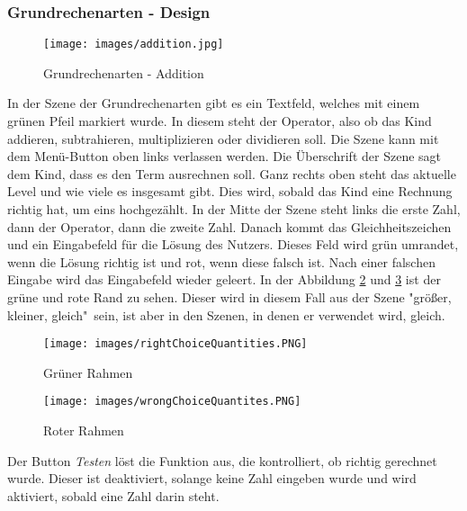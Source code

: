 \subsubsection{Grundrechenarten - Design}
\begin{figure}[htbp]
  \centering
  \texttt{[image: images/addition.jpg]}
  \caption{Grundrechenarten - Addition}
  \label{basicOperation}
\end{figure}
In der Szene der Grundrechenarten gibt es ein Textfeld, welches mit einem grünen Pfeil markiert wurde. In diesem steht der Operator, also ob das Kind addieren, subtrahieren, multiplizieren oder dividieren soll. Die Szene kann mit dem Menü-Button oben links verlassen werden. Die Überschrift der Szene sagt dem Kind, dass es den Term ausrechnen soll. Ganz rechts oben steht das aktuelle Level und wie viele es insgesamt gibt. Dies wird, sobald das Kind eine Rechnung richtig hat, um eins hochgezählt. In der Mitte der Szene steht links die erste Zahl, dann der Operator, dann die zweite Zahl. Danach kommt das Gleichheitszeichen und ein Eingabefeld für die Lösung des Nutzers. Dieses Feld wird grün umrandet, wenn die Lösung richtig ist und rot, wenn diese falsch ist. Nach einer falschen Eingabe wird das Eingabefeld wieder geleert. In der Abbildung \ref{greenBorder} und \ref{redBorder} ist der grüne und rote Rand zu sehen. Dieser wird in diesem Fall aus der Szene "größer, kleiner, gleich"\ sein, ist aber in den Szenen, in denen er verwendet wird, gleich. 
\begin{figure}[htbp]
  \centering
  \texttt{[image: images/rightChoiceQuantities.PNG]}
  \caption{Grüner Rahmen}
  \label{greenBorder}
\end{figure}
\begin{figure}[htbp]
  \centering
  \texttt{[image: images/wrongChoiceQuantites.PNG]}
  \caption{Roter Rahmen}
  \label{redBorder}
\end{figure}
Der Button \textit{Testen} löst die Funktion aus, die kontrolliert, ob richtig gerechnet wurde. Dieser ist deaktiviert, solange keine Zahl eingeben wurde und wird aktiviert, sobald eine Zahl darin steht.
